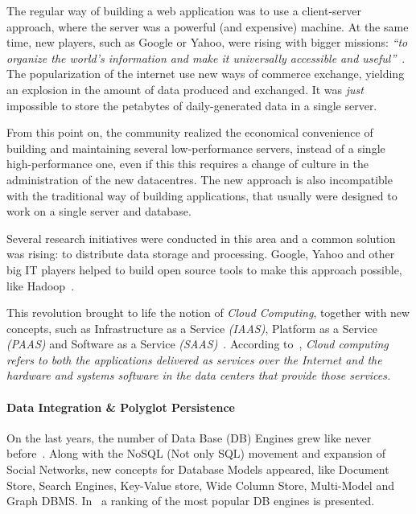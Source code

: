 \documentclass[a4paper]{IEEEtran}
\begin{document}
The regular way of building a web application was to use a client-server approach, where the server was a powerful (and expensive) machine. 
At the same time, new players, such as Google or Yahoo, were rising with bigger missions: \textit{``to organize the world's information and make it universally accessible and useful''}~\cite{Spector:2012:GHA:2209249.2209262}. 
The popularization of the internet use new ways of commerce exchange, yielding an explosion in the amount of data produced and exchanged. 
It was \textit{just} impossible to store the petabytes of daily-generated data in a single server. 

From this point on, the community realized the economical convenience of building and maintaining several low-performance servers, instead of a single high-performance one, even if this this requires a change of culture in the administration of the new datacentres.
The new approach is also incompatible with the traditional way of building applications, that usually were designed to work on a single server and database. 

Several research initiatives were conducted in this area and a common solution was rising: to distribute data storage and processing. 
Google, Yahoo and other big IT players helped to build open source tools to make this approach possible, like Hadoop~\cite{5496972}.

This revolution brought to life the notion of \textit{Cloud Computing}, together with new concepts, such as Infrastructure as a Service \textit{(IAAS)}, Platform as a Service \textit{(PAAS)} and Software as a Service \textit{(SAAS)}~\cite{AViewOfCloudComputing}.
According to~\cite{AViewOfCloudComputing}, \textit{Cloud computing refers to both the applications delivered as services over the Internet and the hardware and systems software in the data centers that provide those services.} 


\paragraph*{Data Integration \& Polyglot Persistence}
On the last years, the number of Data Base (DB) Engines grew like never before~\cite{dbranking}. 
Along with the NoSQL (Not only SQL) movement and expansion of Social Networks, new concepts for Database Models appeared, like Document Store, Search Engines, Key-Value store, Wide Column Store, Multi-Model and Graph DBMS. 
In~\cite{dbranking} a ranking of the most popular DB engines is presented.
\end{document}
